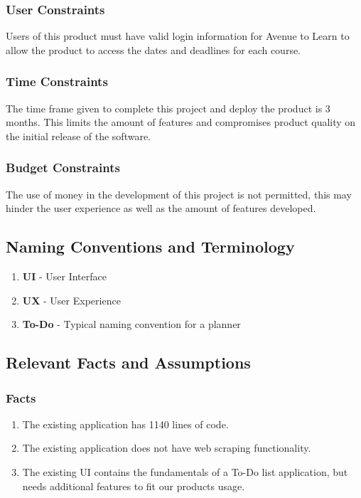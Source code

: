 \documentclass[12pt, titlepage]{article}
\begin{document}
\subsubsection{User Constraints}

Users of this product must have valid login information for Avenue to Learn to allow the product to access the dates and deadlines for each course.

\subsubsection{Time Constraints}

The time frame given to complete this project and deploy the product is 3 months. This limits the amount of features and compromises product quality on the initial release of the software.

\subsubsection{Budget Constraints}

The use of money in the development of this project is not permitted, this may hinder the user experience as well as the amount of features developed.

\subsection{Naming Conventions and Terminology}

\begin{enumerate}
\item \textbf{UI} - User Interface
\item \textbf{UX} - User Experience
\item \textbf{To-Do} - Typical naming convention for a planner
\end{enumerate}

\subsection{Relevant Facts and Assumptions}

\subsubsection{Facts}

\begin{enumerate}
\item The existing application has 1140 lines of code.
\item The existing application does not have web scraping functionality.
\item The existing UI contains the fundamentals of a To-Do list application, but needs additional features to fit our products usage.
\end{enumerate}
\end{document}
